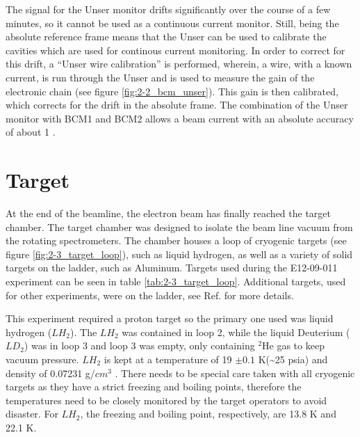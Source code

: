 \documentclass[
]{report}
\begin{document}
The signal for the Unser monitor drifts significantly over the course of
a few minutes, so it cannot be used as a continuous current monitor.
Still, being the absolute reference frame means that the Unser can be
used to calibrate the cavities which are used for continous current
monitoring. In order to correct for this drift, a ``Unser wire
calibration'' is performed, wherein, a wire, with a known current, is
run through the Unser and is used to measure the gain of the electronic
chain (see figure \ref{fig:2-2_bcm_unser}). This gain is then
calibrated, which corrects for the drift in the absolute frame. The
combination of the Unser monitor with BCM1 and BCM2 allows a beam
current with an absolute accuracy of about 1 \cite{denard_high_2001}.

\hypertarget{Section-4.3}{%
\section{Target}\label{Section-4.3}}

At the end of the beamline, the electron beam has finally reached the
target chamber. The target chamber was designed to isolate the beam line
vacuum from the rotating spectrometers. The chamber houses a loop of
cryogenic targets (see figure \ref{fig:2-3_target_loop}), such as liquid
hydrogen, as well as a variety of solid targets on the ladder, such as
Aluminum. Targets used during the E12-09-011 experiment can be seen in
table \ref{tab:2-3_target_loop}. Additional targets, used for other
experiments, were on the ladder, see Ref. \cite{sta_jeerson_2019} for
more details.





This experiment required a proton target so the primary one used was
liquid hydrogen (\(LH_2\)). The \(LH_2\) was contained in loop 2, while
the liquid Deuterium (\(LD_2\)) was in loop 3 and loop 3 was empty, only
containing \(^{2}\mathrm{He}\) gas to keep vacuum pressure. \(LH_2\) is
kept at a temperature of 19 \(\pm 0.1\) K(\textasciitilde25 psia) and
density of 0.07231 g/\(cm^3\) \cite{smith_g_hall_2016}. There needs to
be special care taken with all cryogenic targets as they have a strict
freezing and boiling points, therefore the temperatures need to be
closely monitored by the target operators to avoid disaster. For
\(LH_2\), the freezing and boiling point, respectively, are 13.8 K and
22.1 K.
\end{document}
